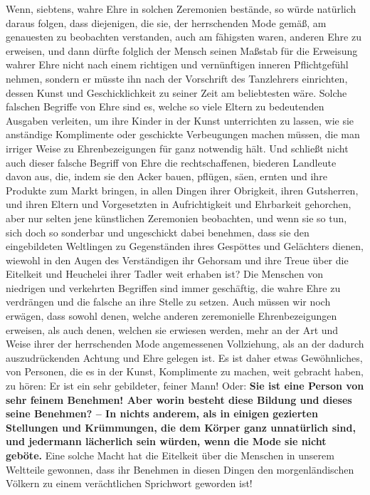 Wenn, siebtens, wahre Ehre in solchen Zeremonien bestände, so würde natürlich
daraus folgen, dass diejenigen, die sie, der herrschenden Mode gemäß, am
genauesten zu beobachten verstanden, auch am fähigsten waren, anderen Ehre zu
erweisen, und dann dürfte folglich der Mensch seinen Maßstab für die Erweisung
wahrer Ehre nicht nach einem richtigen und vernünftigen inneren Pflichtgefühl
nehmen, sondern er müsste ihn nach der Vorschrift des Tanzlehrers einrichten,
dessen Kunst und Geschicklichkeit zu seiner Zeit am beliebtesten wäre. Solche
falschen Begriffe von Ehre sind es, welche so viele
Eltern
zu bedeutenden
Ausgaben verleiten, um ihre Kinder in der Kunst unterrichten zu lassen, wie sie
anständige Komplimente oder geschickte Verbeugungen machen müssen, die man
irriger Weise zu Ehrenbezeigungen für ganz notwendig hält.
 Und schließt nicht
auch dieser falsche Begriff von Ehre die rechtschaffenen, biederen Landleute
davon aus, die, indem sie den Acker bauen, pflügen, säen, ernten und ihre
Produkte zum Markt bringen, in allen Dingen ihrer Obrigkeit, ihren Gutsherren,
und ihren Eltern und Vorgesetzten in Aufrichtigkeit und Ehrbarkeit gehorchen,
aber nur selten jene künstlichen Zeremonien beobachten, und wenn sie so tun,
sich doch so sonderbar und ungeschickt dabei benehmen, dass sie den
eingebildeten Weltlingen zu Gegenständen ihres Gespöttes und Gelächters dienen,
wiewohl in den Augen des Verständigen ihr Gehorsam und ihre Treue über die
Eitelkeit und Heuchelei ihrer Tadler weit erhaben ist? Die Menschen von
niedrigen und verkehrten Begriffen sind immer geschäftig, die wahre Ehre zu
verdrängen und die falsche an ihre Stelle zu setzen. Auch müssen wir noch
erwägen, dass sowohl denen, welche anderen zeremonielle Ehrenbezeigungen
erweisen,
als auch denen, welchen sie erwiesen werden, mehr an der Art und Weise ihrer der
herrschenden Mode angemessenen Vollziehung, als an der dadurch auszudrückenden
Achtung und Ehre gelegen ist. Es ist daher etwas Gewöhnliches, von Personen, die
es in der Kunst, Komplimente zu machen, weit gebracht haben, zu hören: Er ist
ein sehr gebildeter, feiner Mann!
Oder: \label{ref:09_26_feines_benemen} \textbf{Sie ist
eine Person von sehr feinem
Benehmen! Aber worin besteht diese Bildung und dieses seine Benehmen? -- In
nichts anderem, als in einigen gezierten Stellungen und Krümmungen, die dem
Körper ganz unnatürlich sind, und jedermann lächerlich sein würden, wenn die
Mode
sie nicht geböte.} Eine solche Macht hat die Eitelkeit über die Menschen in
unserem Weltteile gewonnen, dass ihr Benehmen in diesen Dingen den
morgenländischen Völkern zu einem verächtlichen Sprichwort geworden ist!

